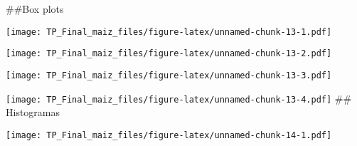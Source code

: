 \documentclass[
]{article}
\newenvironment{Shaded}{\begin{snugshade}}{\end{snugshade}}
\newcommand{\FunctionTok}[1]{\textcolor[rgb]{0.13,0.29,0.53}{\textbf{#1}}}
\newcommand{\NormalTok}[1]{#1}
\newcommand{\SpecialCharTok}[1]{\textcolor[rgb]{0.81,0.36,0.00}{\textbf{#1}}}
\begin{document}
\#\#Box plots

\begin{Shaded}
\end{Shaded}

\texttt{[image: TP\_Final\_maiz\_files/figure-latex/unnamed-chunk-13-1.pdf]}

\begin{Shaded}
\end{Shaded}

\texttt{[image: TP\_Final\_maiz\_files/figure-latex/unnamed-chunk-13-2.pdf]}

\begin{Shaded}
\end{Shaded}

\texttt{[image: TP\_Final\_maiz\_files/figure-latex/unnamed-chunk-13-3.pdf]}

\begin{Shaded}
\end{Shaded}

\texttt{[image: TP\_Final\_maiz\_files/figure-latex/unnamed-chunk-13-4.pdf]}
\#\# Histogramas

\begin{Shaded}
\end{Shaded}

\texttt{[image: TP\_Final\_maiz\_files/figure-latex/unnamed-chunk-14-1.pdf]}

\begin{Shaded}
\end{Shaded}
\end{document}
